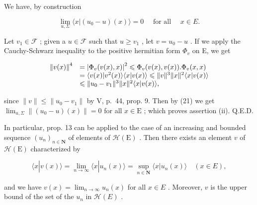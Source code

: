We have, by construction

\[
\lim _ {u, \Sigma} \langle x | (u _ {0} - u) (x) \rangle = 0 \quad \text { for   all } \quad x \in E.\tag{21}
\]

Let \(v_{1} \in \mathcal{F}\) ; given a \(u \in \mathcal{F}\) such that \(u \geqslant v_{1}\) , let \(v = u_{0} - u\) . If we apply the Cauchy-Schwarz inequality to the positive hermitian form \(\Phi_v\) on E, we get

\[
\begin{array}{r l} \left\| v (x) \right\| ^ {4} & = \left| \Phi_ {v} (v (x), x) \right| ^ {2} \leqslant \Phi_ {v} (v (x), v (x)). \Phi_ {v} (x, x) \\ & = \langle v (x) | v ^ {2} (x) \rangle \langle x | v (x) \rangle \leqslant \| v \| ^ {3} \| x \| ^ {2} \langle x | v (x) \rangle \\ & \leqslant \| u _ {0} - v _ {1} \| ^ {3} \| x \| ^ {2} \langle x | v (x) \rangle , \end{array}
\]

since \(\| v\| \leqslant \| u_0 - v_1\|\) by V, p.~44, prop. 9. Then by (21) we get \(\lim_{u,\Sigma}\left\| (u_0 - u)(x)\right\| = 0\) for all \(x\in \mathrm{E}\) ; which proves assertion (ii). Q.E.D.

In particular, prop. 13 can be applied to the case of an increasing and bounded sequence \((u_n)_{n\in \mathbf{N}}\) of elements of \(\mathcal{H}(\mathrm{E})\) . Then there exists an element \(v\) of \(\mathcal{H}(\mathrm{E})\) characterized by

\[
\langle x | v (x) \rangle = \lim _ {n \rightarrow \infty} \langle x | u _ {n} (x) \rangle = \sup _ {n \in \mathbf {N}} \langle x | u _ {n} (x) \rangle \quad (x \in E),
\]

and we have \(v(x) = \lim_{n\to \infty}u_n(x)\) for all \(x\in E\) . Moreover, \(v\) is the upper bound of the set of the \(u_{n}\) in \(\mathcal{H}(E)\) .


